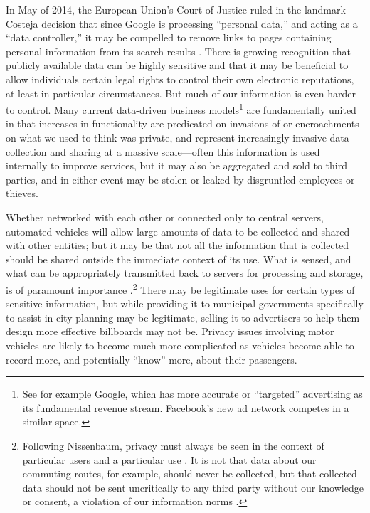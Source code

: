 
 In May of 2014, the European
Union's Court of Justice 
ruled in the landmark Costeja decision that since Google is processing
``personal data,'' and acting as a ``data controller,'' it may be
compelled to remove links to pages containing personal information
from its search results \cite{ICO} \cite{COJCosteja}. There is growing recognition that publicly
available data can be highly sensitive and that it may be beneficial
to allow individuals certain legal rights to control their own
electronic reputations, at least in particular circumstances. But much of our
information is even harder to control. Many current data-driven
business models\footnote{See for example 
  Google, which has more accurate or ``targeted'' advertising
  as its fundamental revenue stream. Facebook's new ad network
  competes in a similar space.} are fundamentally united in that increases in
functionality are predicated on invasions of or encroachments on what
we used to think was private, and represent increasingly invasive data
collection and sharing at a massive scale---often this information is
used internally to improve services, but it may also be aggregated and
sold to third parties, and in either event may be stolen or leaked by
disgruntled employees or thieves. %

Whether networked with each other or connected only to central
servers, automated vehicles will allow large amounts of data to be collected
and shared with other entities; but it may be that not all the
information that is collected should be shared outside the immediate
context of its use. What is sensed, and what can be appropriately
transmitted back to servers for processing and storage, is of
paramount importance
\cite{nissenbaum}.\footnote{Following Nissenbaum, privacy must always
  be seen in the context of 
particular users and a particular use \cite[p. 2]{nissenbaum}. It is not that data about our
commuting routes, for example, should never be collected, but that collected data
should not be sent uncritically to any third party without our
knowledge or consent, a violation of our information norms \cite[p.
  3]{nissenbaum}.}
There may be legitimate uses for certain types of sensitive information, but
while providing it to municipal governments specifically to assist in
city planning may be legitimate, selling it to advertisers to help
them design more effective billboards may not be. Privacy issues
involving motor vehicles are likely to become much more complicated as
vehicles become able to record more, and potentially ``know'' more,
about their passengers.


